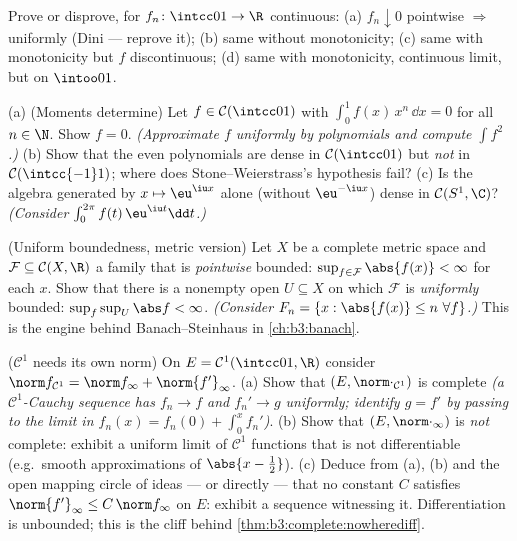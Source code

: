 \begin{exercise}[$\star\star$]\label{exo:b3:complete:8}
Prove or disprove, for $f_n \colon \intcc01 \to \R$ continuous:
(a) $f_n \downarrow 0$ pointwise $\Rightarrow$ uniformly (Dini
--- reprove it); (b) same without monotonicity; (c) same with
monotonicity but $f$ discontinuous; (d) same with monotonicity,
continuous limit, but on $\intoo01$.
\end{exercise}

\begin{exercise}[$\star\star$]\label{exo:b3:complete:9}
(a) (Moments determine) Let $f \in \mathcal C(\intcc01)$ with
$\int_0^1 f(x)\,x^n\,\dd x = 0$ for all $n \in \N$. Show $f =
0$. \emph{(Approximate $f$ uniformly by polynomials and compute
$\int f^2$.)}
(b) Show that the even polynomials are dense in $\mathcal
C(\intcc01)$ but \emph{not} in $\mathcal C(\intcc{-1}1)$; where
does Stone--Weierstrass's hypothesis fail?
(c) Is the algebra generated by $x \mapsto \eu^{\iu x}$ alone
(without $\eu^{-\iu x}$) dense in $\mathcal C(S^1, \C)$?
\emph{(Consider $\int_0^{2\pi}f(t)\,\eu^{\iu t}\dd t$.)}
\end{exercise}

\begin{exercise}[$\star\star\star$]\label{exo:b3:complete:10}
(Uniform boundedness, metric version) Let $X$ be a complete
metric space and $\mathcal F \subseteq \mathcal C(X, \R)$ a
family that is \emph{pointwise} bounded: $\sup_{f \in \mathcal
F}\abs{f(x)} < \infty$ for each $x$. Show that there is a
nonempty open $U \subseteq X$ on which $\mathcal F$ is
\emph{uniformly} bounded: $\sup_{f}\sup_U \abs f < \infty$.
\emph{(Consider $F_n = \{x : \abs{f(x)} \leq n\ \forall f\}$.)}
This is the engine behind Banach--Steinhaus in
\cref{ch:b3:banach}.
\end{exercise}

\begin{exercise}[$\star\star$]\label{exo:b3:complete:11}
($\mathcal C^1$ needs its own norm) On $E = \mathcal
C^1(\intcc01, \R)$ consider $\norm f_{\mathcal C^1} = \norm
f_\infty + \norm{f'}_\infty$.
(a) Show that $(E, \norm\cdot_{\mathcal C^1})$ is complete
\emph{(a $\mathcal C^1$-Cauchy sequence has $f_n \to f$ and
$f_n' \to g$ uniformly; identify $g = f'$ by passing to the
limit in $f_n(x) = f_n(0) + \int_0^xf_n'$)}.
(b) Show that $(E, \norm\cdot_\infty)$ is \emph{not}
complete: exhibit a uniform limit of $\mathcal C^1$ functions
that is not differentiable (e.g.\ smooth approximations of
$\abs{x - \tfrac12}$).
(c) Deduce from (a), (b) and the open mapping circle of ideas
--- or directly --- that no constant $C$ satisfies
$\norm{f'}_\infty \leq C\,\norm f_\infty$ on $E$: exhibit a
sequence witnessing it. Differentiation is unbounded; this is
the cliff behind \cref{thm:b3:complete:nowherediff}.
\end{exercise}

